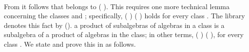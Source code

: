 \begin{code}%
\>[0]\<%
\\
\>[0][@{}l@{\AgdaIndent{1}}]%
\>[1]\AgdaSpace{}%
\AgdaSymbol{:}\AgdaSpace{}%
\AgdaSpace{}%
\AgdaOperator{\AgdaFunction{𝔽[}}\AgdaSpace{}%
\AgdaSpace{}%
\AgdaOperator{\AgdaFunction{]}}\AgdaSpace{}%
\<%
\\
%
\>[1]\AgdaSpace{}%
\AgdaSymbol{=}\AgdaSpace{}%
\AgdaSpace{}%
\AgdaSpace{}%
\AgdaSpace{}%
\AgdaOperator{\AgdaInductiveConstructor{,}}\AgdaSpace{}%
\AgdaSpace{}%
\AgdaSymbol{\{}\AgdaSpace{}%
\AgdaSpace{}%
\AgdaSymbol{=}\AgdaSpace{}%
\AgdaSpace{}%
\AgdaSpace{}%
\AgdaSpace{}%
\AgdaSymbol{;}\AgdaSpace{}%
\AgdaSpace{}%
\AgdaSymbol{=}\AgdaSpace{}%
\AgdaSpace{}%
\AgdaSymbol{\}}\<%
\\
%
\\[\AgdaEmptyExtraSkip]%
%
\>[1]\AgdaSpace{}%
\AgdaSymbol{:}\AgdaSpace{}%
\AgdaOperator{\AgdaFunction{𝔽[}}\AgdaSpace{}%
\AgdaSpace{}%
\AgdaOperator{\AgdaFunction{]}}\AgdaSpace{}%
\AgdaSpace{}%
\<%
\\
%
\>[1]\AgdaSpace{}%
\AgdaSymbol{=}\AgdaSpace{}%
\AgdaSpace{}%
\<%
\\
\>[0]\<%
\end{code}
From  it follows that  belongs to  ( ). This
requires one more technical lemma concerning the classes  and ; specifically,
\ifshort
{} ( )   ( ) holds for every class .
The \agdaalgebras library denotes this fact by  (\seeshort).
\else
a product of subalgebras of algebras in a class is a subalgebra of a product of algebras in the class;
in other terms,  ( )   ( ), for every class .
We state and prove this in \agda as follows.

